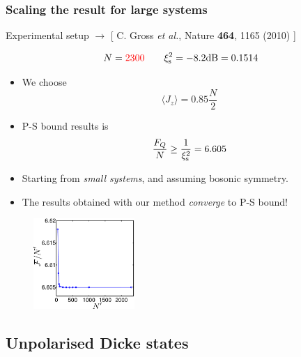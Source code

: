 \documentclass{beamer}
\newcommand{\expect}[1]{\ensuremath{\langle #1 \rangle}}
\newcommand{\citate}[1]{{\footnotesize{\color{gray}[ #1 ]}}

	}
\begin{document}
		\begin{frame}
			\frametitle{Scaling the result for large systems}

			{\small Experimental setup $\rightarrow$ \citate{C. Gross {\it et al.}, Nature {\bf 464}, 1165 (2010)}}
				\begin{block}
					{}
					\[
					N = {\color{red}2300}\qquad \xi^2_{\rm s} =-8.2{\rm dB}=0.1514
					\]
					\vspace{-12px}
				\end{block}
				\begin{itemize}
					\item<2-> We choose
					\[ \expect{J_z} = 0.85 \frac{N}{2}
					\]
					\item<3-> P-S bound results is
					\[
					\frac{F_Q}{N} \geq \frac{1}{\xi_{\rm s}^2} = 6.605
					\]
				\end{itemize}
		\end{frame}

		\begin{frame}

			\begin{itemize}
				\item Starting from \emph{\color{blue}small systems}, and assuming bosonic symmetry.
				\vspace{5px}
				\item The results obtained with our method \emph{\color{blue}converge} to P-S bound!
			\end{itemize}
			\begin{figure}
				\includegraphics[height=130px]{img/scaling-spsq.pdf}
			\end{figure}

		\end{frame}

	\subsection{Unpolarised Dicke states}
\end{document}
